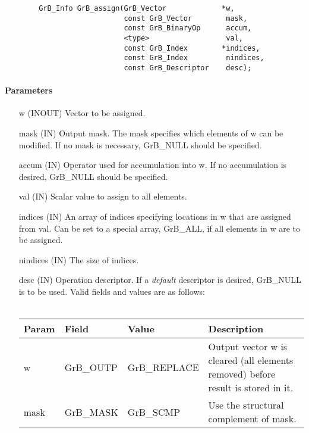 \begin{verbatim}
        GrB_Info GrB_assign(GrB_Vector             *w,
                            const GrB_Vector        mask,
                            const GrB_BinaryOp      accum,
                            <type>                  val,
                            const GrB_Index        *indices,
                            const GrB_Index         nindices,
                            const GrB_Descriptor    desc);
\end{verbatim}

\paragraph{Parameters}

\begin{itemize}[leftmargin=1.1in]
    \item[{\sf w}]   ({\sf INOUT}) Vector to be assigned.

    \item[{\sf mask}]     ({\sf IN}) Output mask. The mask specifies which elements
                              of {\sf w} can be modified. If no mask is necessary, 
                              {\sf GrB\_NULL} should be specified.

    \item[{\sf accum}]    ({\sf IN}) Operator used for accumulation into {\sf w}.
                              If no accumulation is desired, {\sf GrB\_NULL} 
                              should be specified.

    \item[{\sf val}]      ({\sf IN}) Scalar value to assign to all elements.
    \item[{\sf indices}]  ({\sf IN}) An array of indices specifying locations in
                              {\sf w} that are assigned from {\sf val}.  Can be set
                              to a special array, {\sf GrB\_ALL}, if all elements
                              in {\sf w} are to be assigned.
    \item[{\sf nindices}] ({\sf IN}) The size of {\sf indices}.

    \item[{\sf desc}]     ({\sf IN}) Operation descriptor. If a
    \emph{default} descriptor is desired, {\sf GrB\_NULL} is to be
    used. Valid fields and values are as follows: \\ ~\\
    \begin{tabular}{lllp{2.5in}}
    Param & Field  & Value & Description \\
    \hline
    {\sf w}    & {\sf GrB\_OUTP} & {\sf GrB\_REPLACE} & Output vector {\sf w} is cleared (all elements removed) before result is stored in it.\\
    {\sf mask} & {\sf GrB\_MASK} & {\sf GrB\_SCMP}   & Use the structural complement of {\sf mask}. \\
    \end{tabular}

\end{itemize}

